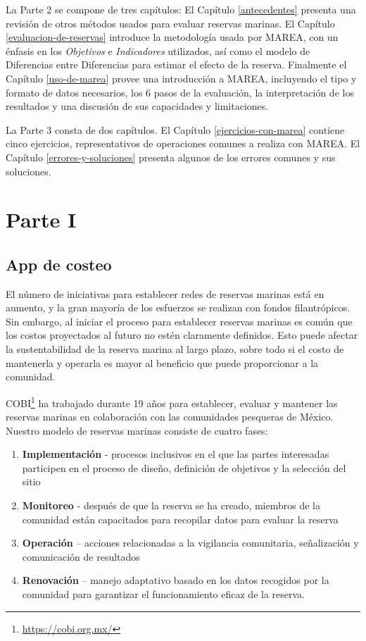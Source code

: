 \documentclass[]{krantz}
\providecommand{\tightlist}{%
  \setlength{\itemsep}{0pt}\setlength{\parskip}{0pt}}
\renewcommand{\href}[2]{#2\footnote{\url{#1}}}
\begin{document}
La Parte 2 se compone de tres capítulos: El Capítulo \ref{antecedentes}
presenta una revisión de otros métodos usados para evaluar reservas
marinas. El Capítulo \ref{evaluacion-de-reservas} introduce la
metodología usada por MAREA, con un énfasis en los \emph{Objetivos} e
\emph{Indicadores} utilizados, así como el modelo de Diferencias entre
Diferencias para estimar el efecto de la reserva. Finalmente el Capítulo
\ref{uso-de-marea} provee una introducción a MAREA, incluyendo el tipo y
formato de datos necesarios, los 6 pasos de la evaluación, la
interpretación de los resultados y una discusión de sus capacidades y
limitaciones.

La Parte 3 consta de dos capítulos. El Capítulo
\ref{ejercicios-con-marea} contiene cinco ejercicios, representativos de
operaciones comunes a realiza con MAREA. El Capítulo
\ref{errores-y-soluciones} presenta algunos de los errores comunes y sus
soluciones.

\mainmatter

\hypertarget{part-parte-i}{%
\part{Parte I}\label{part-parte-i}}

\hypertarget{app-de-costeo}{%
\chapter{App de costeo}\label{app-de-costeo}}

El número de iniciativas para establecer redes de reservas marinas está
en aumento, y la gran mayoría de los esfuerzos se realizan con fondos
filantrópicos. Sin embargo, al iniciar el proceso para establecer
reservas marinas es común que los costos proyectados al futuro no estén
claramente definidos. Esto puede afectar la sustentabilidad de la
reserva marina al largo plazo, sobre todo si el costo de mantenerla y
operarla es mayor al beneficio que puede proporcionar a la comunidad.

\href{https://cobi.org.mx/}{COBI} ha trabajado durante 19 años para
establecer, evaluar y mantener las reservas marinas en colaboración con
las comunidades pesqueras de México. Nuestro modelo de reservas marinas
consiste de cuatro fases:

\begin{enumerate}
\def\labelenumi{\arabic{enumi}.}
\tightlist
\item
  \textbf{Implementación} - procesos inclusivos en el que las partes
  interesadas participen en el proceso de diseño, definición de
  objetivos y la selección del sitio
\item
  \textbf{Monitoreo} - después de que la reserva se ha creado, miembros
  de la comunidad están capacitados para recopilar datos para evaluar la
  reserva
\item
  \textbf{Operación} -- acciones relacionadas a la vigilancia
  comunitaria, señalización y comunicación de resultados
\item
  \textbf{Renovación} -- manejo adaptativo basado en los datos recogidos
  por la comunidad para garantizar el funcionamiento eficaz de la
  reserva.
\end{enumerate}
\end{document}
